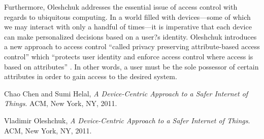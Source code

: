 \documentclass[11pt, oneside]{article}   	%
\begin{document}
Furthermore, Oleshchuk addresses the essential issue of access control with regards to ubiquitous computing. In a world filled with devices---some of which we may interact with only a handful of times---it is imperative that each device can make personalized decisions based on a user?s identity. Oleshchuk introduces a new approach to access control ``called privacy preserving attribute-based access control'' which ``protects user identity and enforce access control where access is based on attributes'' \cite{oleshchuk}. In other words, a user must be the sole possessor of certain attributes in order to gain access to the desired system.




\begin{thebibliography}{9}

  Chao Chen and Sumi Helal,
  \emph{A Device-Centric Approach to a Safer Internet of Things}.
  ACM, New York, NY,
  2011.
  
  Vladimir Oleshchuk,
  \emph{A Device-Centric Approach to a Safer Internet of Things}.
  ACM, New York, NY,
  2011.


\end{thebibliography}
\end{document}
